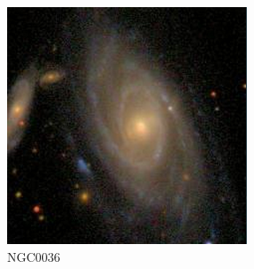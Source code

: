 \documentclass[9pt]{revtex4-1}
\begin{document}
\begin{figure}
\includegraphics[scale=0.3]{NGC0036.png}
\caption{NGC0036}
\end{figure}
\end{document}
